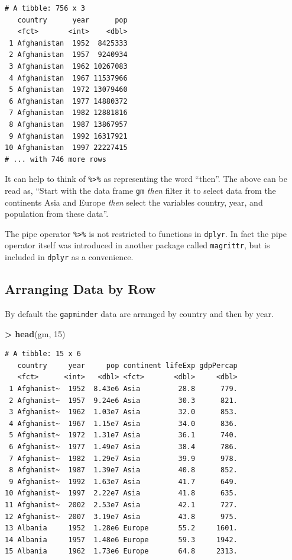 \documentclass[]{krantz}
\makeatletter
\newenvironment{Shaded}{\begin{snugshade}}{\end{snugshade}}
\newcommand{\DecValTok}[1]{\textcolor[rgb]{0.06,0.06,0.06}{#1}}
\newcommand{\KeywordTok}[1]{\textcolor[rgb]{0.27,0.27,0.27}{\textbf{#1}}}
\newcommand{\NormalTok}[1]{#1}
\newcommand{\OperatorTok}[1]{\textcolor[rgb]{0.43,0.43,0.43}{\textbf{#1}}}
\newcommand{\StringTok}[1]{\textcolor[rgb]{0.5,0.5,0.5}{#1}}
\newenvironment{kframe}{%
\medskip{}
\setlength{\fboxsep}{.8em}
 \def\at@end@of@kframe{}%
 \ifinner\ifhmode%
  \def\at@end@of@kframe{\end{minipage}}%
  \begin{minipage}{\columnwidth}%
 \fi\fi%
 \def\FrameCommand##1{\hskip\@totalleftmargin \hskip-\fboxsep
 \colorbox{shadecolor}{##1}\hskip-\fboxsep
     \hskip-\linewidth \hskip-\@totalleftmargin \hskip\columnwidth}%
 \MakeFramed {\advance\hsize-\width
   \@totalleftmargin\z@ \linewidth\hsize
   \@setminipage}}%
 {\par\unskip\endMakeFramed%
 \at@end@of@kframe}
\renewenvironment{Shaded}{\begin{kframe}}{\end{kframe}}
\makeatother
\begin{document}
\begin{verbatim}
# A tibble: 756 x 3
   country      year      pop
   <fct>       <int>    <dbl>
 1 Afghanistan  1952  8425333
 2 Afghanistan  1957  9240934
 3 Afghanistan  1962 10267083
 4 Afghanistan  1967 11537966
 5 Afghanistan  1972 13079460
 6 Afghanistan  1977 14880372
 7 Afghanistan  1982 12881816
 8 Afghanistan  1987 13867957
 9 Afghanistan  1992 16317921
10 Afghanistan  1997 22227415
# ... with 746 more rows
\end{verbatim}

It can help to think of \texttt{\%\textgreater{}\%} as representing the word ``then''. The above can be read as, ``Start with the data frame \texttt{gm} \emph{then} filter it to select data from the continents Asia and Europe \emph{then} select the variables country, year, and population from these data''.

The pipe operator \texttt{\%\textgreater{}\%} is not restricted to functions in \texttt{dplyr}. In fact the pipe operator itself was introduced in another package called \texttt{magrittr}, but is included in \texttt{dplyr} as a convenience.

\hypertarget{arranging-data-by-row}{%
\subsection{Arranging Data by Row}\label{arranging-data-by-row}}

By default the \texttt{gapminder} data are arranged by country and then by year.

\begin{Shaded}
\begin{Highlighting}[]
\OperatorTok{>}\StringTok{ }\KeywordTok{head}\NormalTok{(gm, }\DecValTok{15}\NormalTok{)}
\end{Highlighting}
\end{Shaded}

\begin{verbatim}
# A tibble: 15 x 6
   country     year     pop continent lifeExp gdpPercap
   <fct>      <int>   <dbl> <fct>       <dbl>     <dbl>
 1 Afghanist~  1952  8.43e6 Asia         28.8      779.
 2 Afghanist~  1957  9.24e6 Asia         30.3      821.
 3 Afghanist~  1962  1.03e7 Asia         32.0      853.
 4 Afghanist~  1967  1.15e7 Asia         34.0      836.
 5 Afghanist~  1972  1.31e7 Asia         36.1      740.
 6 Afghanist~  1977  1.49e7 Asia         38.4      786.
 7 Afghanist~  1982  1.29e7 Asia         39.9      978.
 8 Afghanist~  1987  1.39e7 Asia         40.8      852.
 9 Afghanist~  1992  1.63e7 Asia         41.7      649.
10 Afghanist~  1997  2.22e7 Asia         41.8      635.
11 Afghanist~  2002  2.53e7 Asia         42.1      727.
12 Afghanist~  2007  3.19e7 Asia         43.8      975.
13 Albania     1952  1.28e6 Europe       55.2     1601.
14 Albania     1957  1.48e6 Europe       59.3     1942.
15 Albania     1962  1.73e6 Europe       64.8     2313.
\end{verbatim}
\end{document}
